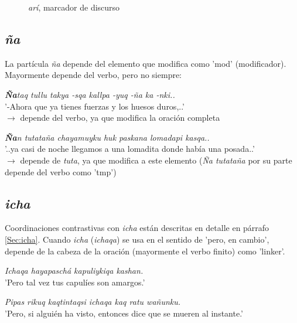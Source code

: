 \documentclass[a4paper,11pt,DIV12]{scrartcl}
\begin{document}
\begin{figure}
\begin{center}
 \caption{{\em ar\'i}, marcador de discurso}\label{Fig:aridm}
\end{center}
\end{figure}

  \subsection{{\em \~na}}
  La part\'icula {\em \~na} depende del elemento que modifica como 'mod' (modificador). Mayormente depende del verbo, pero no siempre:

\begin{examples}
 \item {\em\textbf{Ña}taq tullu takya -sqa kallpa -yuq -ña ka -nki..}\\
      '-Ahora que ya tienes fuerzas y los huesos duros,..'\\
      $\rightarrow$ depende del verbo, ya que modifica la oraci\'on completa
 \item {\em\textbf{\~Na}n tutataña chayamuyku huk paskana lomadapi kasqa..}\\
      '..ya casi de noche llegamos a una lomadita donde había una posada..'\\
      $\rightarrow$ depende de {\em tuta}, ya que modifica a este elemento ({\em\~Na tutataña} por su parte depende del verbo como 'tmp')
\end{examples}



  \subsection{{\em icha}}
Coordinaciones contrastivas con {\em icha} est\'an descritas en detalle en p\'arrafo \ref{Sec:icha}.
Cuando {\em icha} ({\em ichaqa}) se usa en el sentido de 'pero, en cambio', depende de la cabeza de la oraci\'on (mayormente el verbo finito) como 'linker'.
\begin{examples}
 \item {\em Ichaqa hayapasch\'a kapuliykiqa kashan.}\\
      'Pero tal vez tus capul\'ies son amargos.'
 \item {\em Pipas rikuq kaqtintaqsi ichaqa kaq ratu wa\~nunku.}\\
      'Pero, si algui\'en ha visto, entonces dice que se mueren al instante.'\\
	\hfill{\small \citep[272]{Cusi2}}
\end{examples}
 
\end{document}
